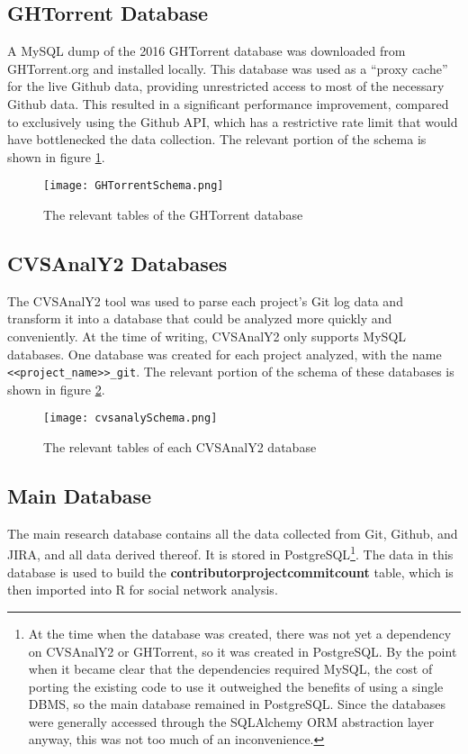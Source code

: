 \subsection{GHTorrent Database}
A MySQL dump of the 2016 GHTorrent database was downloaded from GHTorrent.org and installed locally. This database was used as a ``proxy cache'' for the live Github data, providing unrestricted access to most of the necessary Github data. This resulted in a significant performance improvement, compared to exclusively using the Github API, which has a restrictive rate limit that would have bottlenecked the data collection. The relevant portion of the schema is shown in figure \ref{fig:ghtorrentSchema}.
\begin{figure}
	\texttt{[image: GHTorrentSchema.png]}
	\centering
	\caption{The relevant tables of the GHTorrent database}
	\label{fig:ghtorrentSchema}
\end{figure}
\subsection{CVSAnalY2 Databases}
The CVSAnalY2 tool\cite{cvsanaly} was used to parse each project's Git log data and transform it into a database that could be analyzed more quickly and conveniently. At the time of writing, CVSAnalY2 only supports MySQL databases. One database was created for each project analyzed, with the name \verb|<<project_name>>_git|. The relevant portion of the schema of these databases is shown in figure \ref{fig:cvsanalySchema}.
\begin{figure}
	\texttt{[image: cvsanalySchema.png]}
	\centering
	\caption{The relevant tables of each CVSAnalY2 database}
	\label{fig:cvsanalySchema}
\end{figure}
\subsection{Main Database}
The main research database contains all the data collected from Git, Github, and JIRA, and all data derived thereof. It is stored in PostgreSQL\footnote{At the time when the database was created, there was not yet a dependency on CVSAnalY2 or GHTorrent, so it was created in PostgreSQL. By the point when it became clear that the dependencies required MySQL, the cost of porting the existing code to use it outweighed the benefits of using a single DBMS, so the main database remained in PostgreSQL. Since the databases were generally accessed through the SQLAlchemy ORM abstraction layer anyway, this was not too much of an inconvenience.}. The data in this database is used to build the \textbf{contributorprojectcommitcount} table, which is then imported into R for social network analysis.

